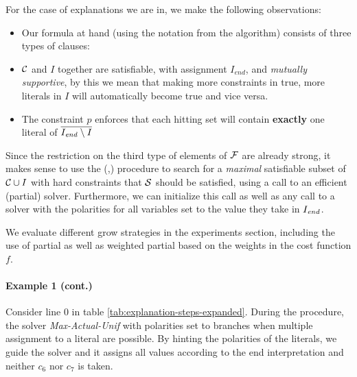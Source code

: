 For the case of explanations we are in, we make the following observations: 
\begin{itemize}
 \item Our formula at hand (using the notation from the \onestepo algorithm) consists of three types of clauses: 
 \item $\mathcal{C} $ and $I$ together are satisfiable, with assignment $I_{end}$, and \emph{mutually supportive}, by this we mean that making more constraints in \formulac true, more literals in $I$ will automatically become true and vice versa. 
 \item The constraint $p$ enforces that each hitting set will contain \textbf{exactly} one literal of  $\overline{I_\mathit{end} \setminus I}$
\end{itemize}
Since the restriction on the third type of elements of $\mathcal{F} $ are already strong, it makes sense to use the \grow(,\F) procedure to search for a \emph{maximal} satisfiable subset of $\mathcal{C} \cup I$ with hard constraints that $\mathcal{S}$ should be satisfied, using a call to an efficient  (partial) \maxsat solver. Furthermore, we can initialize this call as well as any call to a \sat solver with the polarities for all variables set to the value they take in $I_\mathit{end} $. %

We evaluate different grow strategies in the experiments section, including the use of partial \maxsat as well as weighted partial \maxsat based on the weights in the cost function $f$.

\paragraph{Example 1 (cont.)} Consider line 0 in table \ref{tab:explanation-steps-expanded}. During the \grow procedure, the \maxsat solver \emph{Max-Actual-Unif} with polarities set to \Iend branches when multiple assignment to a literal are possible. By hinting the polarities of the literals, we guide the solver and it assigns all values according to the end interpretation and neither $c_6$ nor $c_7$ is taken.




 



